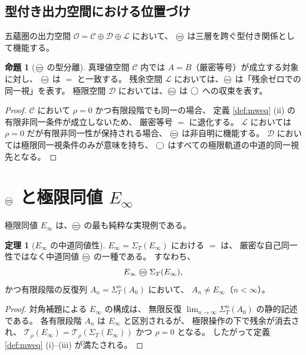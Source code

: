 \documentclass[11pt,a4paper]{article}
\theoremstyle{definition}
\newtheorem{theorem}{定理}[section]
\newtheorem{proposition}{命題}[section]
\newcommand{\C}{\mathcal{C}}
\newcommand{\Lspace}{\mathcal{L}}
\newcommand{\Dspace}{\mathcal{D}}
\newcommand{\Ospace}{\mathcal{O}}
\newcommand{\SelfRef}{\Sigma}
\newcommand{\Einfty}{E_{\infty}}
\begin{document}
\subsection{型付き出力空間における位置づけ}

五蘊圏の出力空間 $\Ospace=\C\oplus\Dspace\oplus\Lspace$ において、
$\mweq$ は三層を跨ぐ型付き関係として機能する。

\begin{proposition}[$\mweq$ の型分離]\label{prop:typed}
真理値空間 $\C$ 内では $A=B$（厳密等号）が成立する対象に対し、
$\mweq$ は $=$ と一致する。
残余空間 $\Lspace$ においては、$\mweq$ は「残余ゼロでの同一視」を表す。
極限空間 $\Dspace$ においては、$\mweq$ は $\bigcirc$ への収束を表す。
\end{proposition}

\begin{proof}
$\C$ において $\rho=0$ かつ有限段階でも同一の場合、
定義 \ref{def:mweq} (ii) の有限非同一条件が成立しないため、
厳密等号 $=$ に退化する。
$\Lspace$ においては $\rho=0$ だが有限非同一性が保持される場合、
$\mweq$ は非自明に機能する。
$\Dspace$ においては極限同一視条件のみが意味を持ち、
$\bigcirc$ はすべての極限軌道の中道的同一視先となる。
\end{proof}

\section{\texorpdfstring{$\mweq$}{mw-equivalence} と極限同値 \texorpdfstring{$E_\infty$}{E-infinity}}

極限同値 $\Einfty$ は、$\mweq$ の最も純粋な実現例である。

\begin{theorem}[$\Einfty$ の中道同値性]\label{thm:einfty-mweq}
$\Einfty = \SelfRef_T(\Einfty)$ における $=$ は、
厳密な自己同一性ではなく中道同値 $\mweq$ の一種である。
すなわち、
\[
\Einfty \mweq \SelfRef_T(\Einfty),
\]
かつ有限段階の反復列 $A_n=\SelfRef_T^n(A_0)$ において、
$A_n\neq\Einfty$（$n<\infty$）。
\end{theorem}

\begin{proof}
対角補題による $\Einfty$ の構成は、
無限反復 $\lim_{n\to\infty}\SelfRef_T^n(A_0)$ の静的記述である。
各有限段階 $A_n$ は $\Einfty$ と区別されるが、
極限操作の下で残余が消去され、
$\mathcal{T}_\rho(\Einfty)=\mathcal{T}_\rho(\SelfRef_T(\Einfty))$
かつ $\rho=0$ となる。
したがって定義 \ref{def:mweq} (i)--(iii) が満たされる。
\end{proof}
\end{document}
